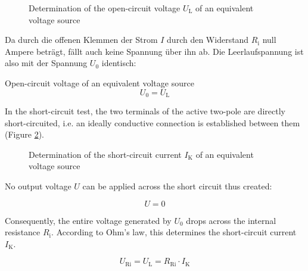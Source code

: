 \begin{frame}
{\begin{figure}[h!]
\begin{center}
				
			\end{center}
			\caption{Determination of the open-circuit voltage $U_\mathrm{L}$ of an equivalent voltage source}
			\label{fig:leerlauf1}
			
			
		\end{figure}
		
		
		Da durch die offenen Klemmen der Strom $I$ durch den Widerstand $R_\mathrm{i}$ null Ampere beträgt, fällt auch keine Spannung über ihn ab.
		Die Leerlaufspannung ist also mit der Spannung $U_0$ identisch:
		
		\begin{Key point}{Open-circuit voltage of an equivalent voltage source}{}
			\begin{equation*}
				U_0 = U_\mathrm{L}
			\end{equation*}
		\end{Key point}
		
		In the short-circuit test, the two terminals of the active two-pole are directly short-circuited, i.e. an
		ideally conductive connection is established between them (Figure \ref{fig:kurzschluss1}).
		
		
		\begin{figure}[h!]
			\renewcommand{\figurename}{Figure}
			\begin{center}

				
			\end{center}
			\caption{Determination of the short-circuit current $I_\mathrm{K}$ of an equivalent voltage source}
			\label{fig:kurzschluss1}
			
			
		\end{figure}
		
		No output voltage $U$ can be applied across the short circuit thus created:
		
		\begin{equation*}
			U = 0
		\end{equation*}
		
		Consequently, the entire voltage generated by $U_0$ drops across the internal resistance $R_\mathrm{i}$.
		According to Ohm's law, this determines the short-circuit current $I_\mathrm{K}$. 
		
		\begin{equation*}
			U_\mathrm{Ri} = U_\mathrm{L} =R_\mathrm{Ri} \cdot I_\mathrm{K}
		\end{equation*}
		
}
\end{frame}
